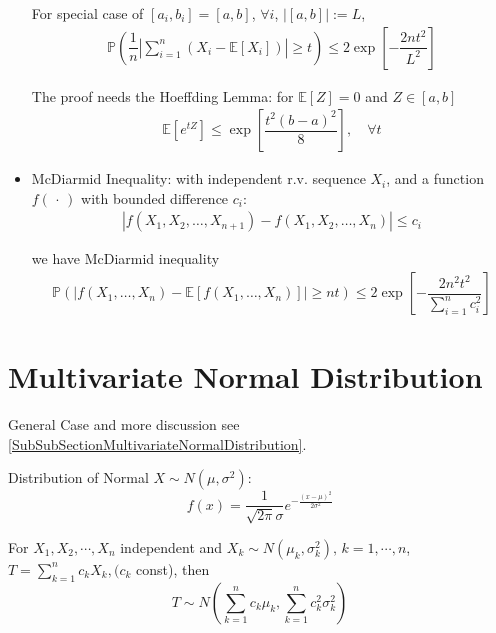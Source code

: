 \begin{itemize}
    For special case of $ [a_i,b_i]=[a,b] $, $ \forall i $, $ |[a,b]|:=L $,
    \begin{align*}
        \mathbb{P}\left( \dfrac{1}{n}\left\vert \sum_{i=1}^n\left(X_i-\mathbb{E}\left[ X_i \right] \right)  \right\vert \geq t   \right)  \leq 2\exp\left[ -\dfrac{2nt^2}{L^2} \right]
    \end{align*}
    
    

    The proof needs the Hoeffding Lemma: for $ \mathbb{E}\left[ Z \right]=0  $ and $ Z\in[a,b] $
    \begin{align}
        \mathbb{E}\left[ e^{tZ} \right]\leq \exp\left[ \dfrac{t^2(b-a)^2}{8} \right],\quad \forall t  
    \end{align}
    
    \item McDiarmid Inequality: with independent r.v. sequence $ X_i $, and a function $ f(\, \cdot \, ) $ with bounded difference $ c_i $:
    \begin{align*}
        \left| f\left(X_1,X_2,\ldots,X_{n+1}\right)- f\left(X_1,X_2,\ldots,X_{n}\right) \right| \leq c_i
    \end{align*}

    we have McDiarmid inequality
    \begin{align*}
        \mathbb{P}\left( \left| f(X_1,\ldots,X_n)-\mathbb{E}\left[ f(X_1,\ldots,X_n) \right]  \right| \geq nt\right) \leq 2\exp\left[ -\dfrac{2n^2t^2}{\sum_{i=1}^nc_i^2} \right] 
    \end{align*}
    
\end{itemize}


\section{Multivariate Normal Distribution}\label{SubsectionDerivationMultivariateNormal}
    General Case and more discussion see \autoref{SubSubSectionMultivariateNormalDistribution}.

    Distribution of Normal $ X\sim N(\mu ,\sigma ^2) $:
    \[
        f(x)=\dfrac{1}{\sqrt{2\pi}\sigma }e^{-\frac{(x-\mu )^2}{2\sigma ^2}} 
    \]
    
    

    For $X_1,X_2,\cdots,X_n$ independent and $X_k\sim N(\mu_k,\sigma^2_k),\, k=1,\cdots,n$, $T={\displaystyle\sum_{k=1}^n c_kX_k}, (c_k$ const), then
    \begin{equation}
        T\sim N(\sum_{k=1}^nc_k\mu_k,\sum_{k=1}^n c_k^2\sigma^2_k)    
    \end{equation}

